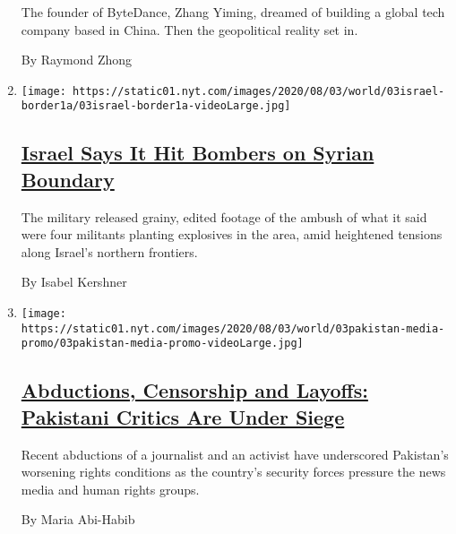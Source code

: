 \begin{enumerate}
  The founder of ByteDance, Zhang Yiming, dreamed of building a global
  tech company based in China. Then the geopolitical reality set in.

  By Raymond Zhong
\item
  \texttt{[image: https://static01.nyt.com/images/2020/08/03/world/03israel-border1a/03israel-border1a-videoLarge.jpg]}

  \hypertarget{israel-says-it-hit-bombers-on-syrian-boundary}{%
  \subsection{\texorpdfstring{\href{/2020/08/03/world/middleeast/israel-syria-border.html}{Israel
  Says It Hit Bombers on Syrian
  Boundary}}{Israel Says It Hit Bombers on Syrian Boundary}}\label{israel-says-it-hit-bombers-on-syrian-boundary}}

  The military released grainy, edited footage of the ambush of what it
  said were four militants planting explosives in the area, amid
  heightened tensions along Israel's northern frontiers.

  By Isabel Kershner
\item
  \texttt{[image: https://static01.nyt.com/images/2020/08/03/world/03pakistan-media-promo/03pakistan-media-promo-videoLarge.jpg]}

  \hypertarget{abductions-censorship-and-layoffs-pakistani-critics-are-under-siege}{%
  \subsection{\texorpdfstring{\href{/2020/08/03/world/asia/pakistan-media-abductions.html}{Abductions,
  Censorship and Layoffs: Pakistani Critics Are Under
  Siege}}{Abductions, Censorship and Layoffs: Pakistani Critics Are Under Siege}}\label{abductions-censorship-and-layoffs-pakistani-critics-are-under-siege}}

  Recent abductions of a journalist and an activist have underscored
  Pakistan's worsening rights conditions as the country's security
  forces pressure the news media and human rights groups.

  By Maria Abi-Habib
\end{enumerate}

